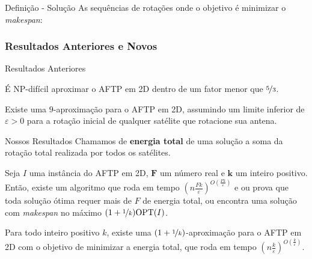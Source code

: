 \begin{frame}{Definição - Solução}
  As sequências de rotações onde o objetivo é minimizar o \emph{makespan}:

  \pause

  \bigskip
  \begin{minipage}{\linewidth}
    \centering
    \colorbox{white}{}
  \end{minipage}
\end{frame}


\subsubsection{Resultados Anteriores e Novos}

\begin{frame}{Resultados Anteriores}
  \begin{thm}
    É NP-difícil aproximar o AFTP em 2D dentro de um fator menor que $\nicefrac{5}{3}$.
  \end{thm}

  \pause

  \begin{thm}
    Existe uma $9$-aproximação para o AFTP em 2D, assumindo um limite inferior de $\varepsilon>0$ para a rotação inicial de qualquer satélite que rotacione sua antena.
  \end{thm}
\end{frame}

\begin{frame}{Nossos Resultados}
  Chamamos de \textbf{energia total} de uma solução a soma da rotação total realizada por todos os satélites.

  \pause

  \begin{thm}
    Seja $I$ uma instância do AFTP em 2D, $\mathbf{F}$ um número real e $\mathbf{k}$ um inteiro positivo.
    Então, existe um algoritmo que roda em tempo ${(n\frac{Fk}{\varepsilon})^{O(\frac{Fk}{\varepsilon})}}$ e ou prova que toda solução ótima requer mais de $F$ de energia total, ou encontra uma solução com \emph{makespan} no máximo ${(1+\nicefrac{1}{k})\text{OPT}(I)}$.
  \end{thm}

  \pause

  \begin{thm}
    Para todo inteiro positivo $k$, existe uma \mbox{$(1+\nicefrac{1}{k})$-aproximação} para o AFTP em 2D com o objetivo de minimizar a energia total, que roda em tempo \mbox{$(n\frac{k}{\varepsilon})^{O(\frac{k}{\varepsilon})}$}.
  \end{thm}
\end{frame}
